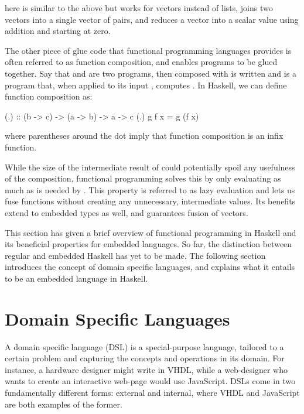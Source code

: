 \documentclass[../paper.tex]{subfiles}
\begin{document}

\noindent {} here is similar to the above  but works for vectors instead of lists,  joins two vectors into a single vector of pairs, and  reduces a vector into a scalar value using addition and starting at zero. 

The other piece of glue code that functional programming languages provides is often referred to as function composition, and enables programs to be glued together. Say that  and  are two programs, then  composed with  is written  and is a program that, when applied to its input , computes . In Haskell, we can define function composition as:

\begin{code}
(.) :: (b -> c) -> (a -> b) -> a -> c
(.) g f x = g (f x)
\end{code}

\noindent where parentheses around the dot imply that function composition is an infix function.

While the size of the intermediate result of  could potentially spoil any usefulness of the composition, functional programming solves this by only evaluating  as much as is needed by . This property is referred to as lazy evaluation and lets us fuse functions without creating any unnecessary, intermediate values. Its benefits extend to embedded types as well, and guarantees fusion of vectors.

This section has given a brief overview of functional programming in Haskell and its beneficial properties for embedded languages. So far, the distinction between regular and embedded Haskell has yet to be made. The following section introduces the concept of domain specific languages, and explains what it entails to be an embedded language in Haskell. 

\section{Domain Specific Languages}
\label{domain}

A domain specific language (DSL) is a special-purpose language, tailored to a certain problem and capturing the concepts and operations in its domain. For instance, a hardware designer might write in VHDL, while a web-designer who wants to create an interactive web-page would use JavaScript. DSLs come in two fundamentally different forms: external and internal, where VHDL and JavaScript are both examples of the former.
\end{document}
